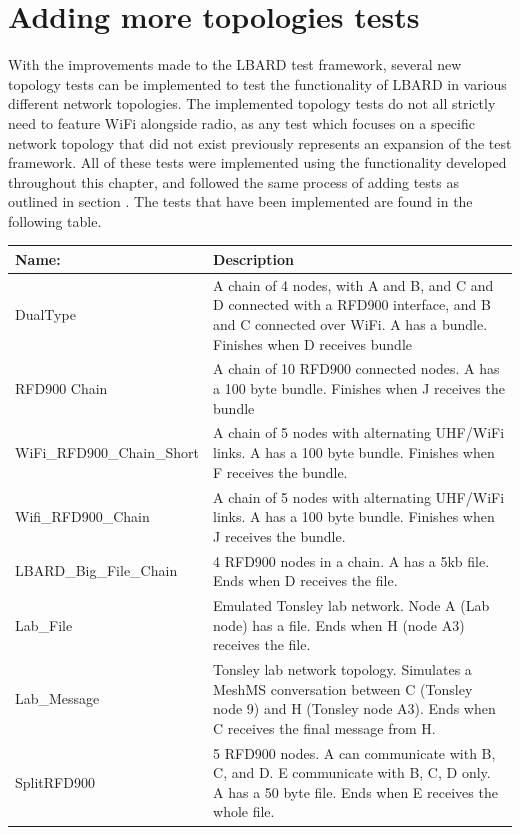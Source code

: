 \section{Adding more topologies tests}
With the improvements made to the LBARD test framework, several new topology tests can be implemented to test the functionality of LBARD in various different network topologies.
The implemented topology tests do not all strictly need to feature WiFi alongside radio, as any test which focuses on a specific network topology that did not exist previously represents an expansion of the test framework.
All of these tests were implemented using the functionality developed throughout this chapter, and followed the same process of adding tests as outlined in section .
The tests that have been implemented are found in the following table.
\begin{table}[h!]
    \centering
    \begin{tabularx}{\textwidth}{l|X}
        \textbf{Name:}  &  \textbf{Description} \\ \hline
        DualType            &   A chain of 4 nodes, with A and B, and C and D connected with a RFD900 interface, and B and C connected over WiFi. A has a bundle. Finishes when D receives bundle \\ \hline
        RFD900 Chain    &   A chain of 10 RFD900 connected nodes. A has a 100 byte bundle. Finishes when J receives the bundle   \\ \hline
        WiFi\_RFD900\_Chain\_Short & A chain of 5 nodes with alternating UHF/WiFi links. A has a 100 byte bundle. Finishes when F receives the bundle. \\ \hline
        Wifi\_RFD900\_Chain & A chain of 5 nodes with alternating UHF/WiFi links. A has a 100 byte bundle. Finishes when J receives the bundle.     \\ \hline
        LBARD\_Big\_File\_Chain & 4 RFD900 nodes in a chain. A has a 5kb file. Ends when D receives the file.  \\ \hline
        Lab\_File   & Emulated Tonsley lab network. Node A (Lab node) has a file. Ends when H (node A3) receives the file.  \\ \hline
        Lab\_Message& Tonsley lab network topology. Simulates a MeshMS conversation between C (Tonsley node 9) and H (Tonsley node A3). Ends when C receives the final message from H.   \\ \hline
        SplitRFD900 & 5 RFD900 nodes. A can communicate with B, C, and D. E communicate with B, C, D only. A has a 50 byte file. Ends when E receives the whole file. \\ \hline        
    \end{tabularx}
\end{table}
